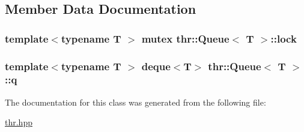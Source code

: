 \subsection{Member Data Documentation}
\hypertarget{classthr_1_1_queue_abadc1f08bfec267edc24baaa442bb451}{
\subsubsection[{lock}]{\setlength{\rightskip}{0pt plus 5cm}template$<$typename T $>$ mutex {\bf thr\-::\-Queue}$<$ T $>$\-::{\bf lock}}}\label{classthr_1_1_queue_abadc1f08bfec267edc24baaa442bb451}
\hypertarget{classthr_1_1_queue_aecde97de4091b83a35dcf2ec42cdcd7b}{
\subsubsection[{q}]{\setlength{\rightskip}{0pt plus 5cm}template$<$typename T $>$ deque$<$T$>$ {\bf thr\-::\-Queue}$<$ T $>$\-::{\bf q}}}\label{classthr_1_1_queue_aecde97de4091b83a35dcf2ec42cdcd7b}


The documentation for this class was generated from the following file\-:\begin{DoxyCompactItemize}
\item 
\hyperlink{thr_8hpp}{thr.\-hpp}\end{DoxyCompactItemize}
